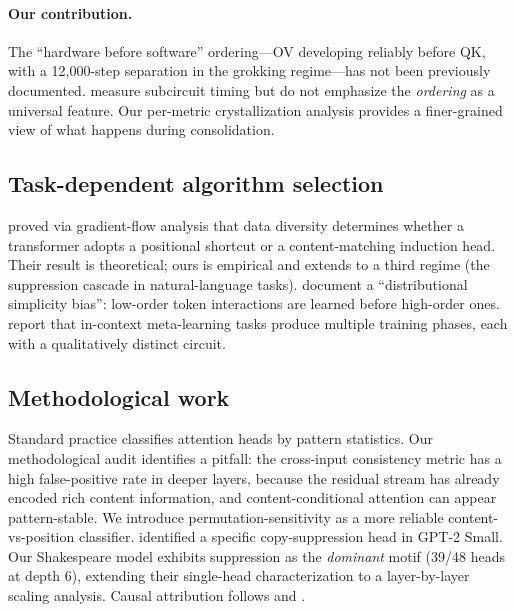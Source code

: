 \documentclass[final]{article}
\begin{document}
\paragraph{Our contribution.}
The ``hardware before software'' ordering---OV developing reliably before QK,
with a 12,000-step separation in the grokking regime---has not been previously
documented. \citet{singh2024induction} measure subcircuit timing but do not
emphasize the \emph{ordering} as a universal feature. Our per-metric
crystallization analysis provides a finer-grained view of what happens during
consolidation.

\subsection{Task-dependent algorithm selection}

\citet{kawata2025shortcut} proved via gradient-flow analysis that data diversity
determines whether a transformer adopts a positional shortcut or a
content-matching induction head. Their result is theoretical; ours is empirical
and extends to a third regime (the suppression cascade in natural-language
tasks). \citet{rende2024simplicity} document a ``distributional simplicity
bias'': low-order token interactions are learned before high-order ones.
\citet{minegishi2025beyond} report that in-context meta-learning tasks produce
multiple training phases, each with a qualitatively distinct circuit.

\subsection{Methodological work}

Standard practice classifies attention heads by pattern statistics. Our
methodological audit identifies a pitfall: the cross-input consistency metric
has a high false-positive rate in deeper layers, because the residual stream has
already encoded rich content information, and content-conditional attention can
appear pattern-stable. We introduce permutation-sensitivity as a more reliable
content-vs-position classifier. \citet{mcdougall2024copysuppression} identified
a specific copy-suppression head in GPT-2 Small. Our Shakespeare model exhibits
suppression as the \emph{dominant} motif (39/48 heads at depth 6), extending
their single-head characterization to a layer-by-layer scaling analysis.
Causal attribution follows \citet{meng2022activation} and \citet{wang2023ioi}.

\end{document}
